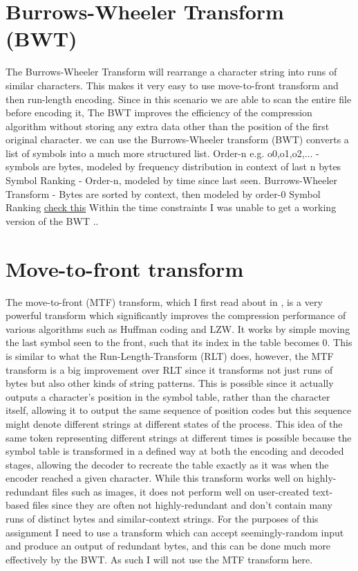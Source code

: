 \documentclass[a4paper, 11pt]{article}
\numberwithin{equation}{section}
\theoremstyle{plain}
\theoremstyle{definition}
\begin{document}
\section{Burrows-Wheeler Transform (BWT)}
The Burrows-Wheeler Transform will rearrange a character string into runs of similar characters. 
This makes it very easy to use move-to-front transform and then run-length encoding.
Since in this scenario we are able to scan the entire file before encoding it, 
The BWT improves the efficiency of the compression algorithm without storing any extra data other than the 
position of the first original character. 
we can use the Burrows-Wheeler transform (BWT) converts a list of symbols into a much more structured list.
Order-n e.g. o0,o1,o2,... - symbols are bytes, modeled by frequency distribution in context of last n bytes
Symbol Ranking - Order-n, modeled by time since last seen.
Burrows-Wheeler Transform - Bytes are sorted by context, then modeled by order-0 Symbol Ranking
\href{https://en.wikipedia.org/wiki/Burrows-Wheeler_transform}{check this}
Within the time constraints I was unable to get a working version of the BWT \cite{TextBenchmark}.. 


\section{Move-to-front transform}
The move-to-front (MTF) transform, which I first read about in \cite{GoogleCompression}, 
is a very powerful transform which significantly improves the compression performance of 
various algorithms such as Huffman coding and LZW. 
It works by simple moving the last symbol seen to the front, such that its index in the table becomes 0. 
This is similar to what the Run-Length-Transform (RLT) does, however, the MTF transform 
is a big improvement over RLT since it transforms not just runs of bytes but also other kinds of 
string patterns. 
This is possible since it actually outputs a character's position in the symbol table, rather than the 
character itself, allowing it to output the same sequence of position codes but this sequence might denote 
different strings at different states of the process. 
This idea of the same token representing different strings at different times is possible because 
the symbol table is transformed in a defined way at both the encoding and decoded stages, allowing 
the decoder to recreate the table exactly as it was when the encoder reached a given character. 
While this transform works well on highly-redundant files such as images, 
it does not perform well on user-created text-based files since they are often not highly-redundant 
and don't contain many runs of distinct bytes and similar-context strings. 
For the purposes of this assignment I need to use a transform which can accept seemingly-random input 
and produce an output of redundant bytes, and this can be done much more effectively by the BWT. 
As such I will not use the MTF transform here.
\end{document}
